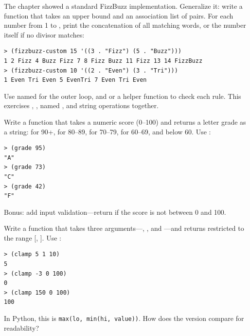 \begin{exercise}
The chapter showed a standard FizzBuzz implementation. Generalize it: write a function  that takes an upper bound  and an association list of  pairs. For each number from 1 to , print the concatenation of all matching words, or the number itself if no divisor matches:

\begin{lstlisting}[style=repl]
> (fizzbuzz-custom 15 '((3 . "Fizz") (5 . "Buzz")))
1 2 Fizz 4 Buzz Fizz 7 8 Fizz Buzz 11 Fizz 13 14 FizzBuzz
> (fizzbuzz-custom 10 '((2 . "Even") (3 . "Tri")))
1 Even Tri Even 5 EvenTri 7 Even Tri Even
\end{lstlisting}

Use named  for the outer loop, and  or a helper function to check each rule. This exercises , , named , and string operations together.
\end{exercise}

\begin{exercise}
Write a function  that takes a numeric score (0--100) and returns a letter grade as a string:  for 90+,  for 80--89,  for 70--79,  for 60--69, and  below 60. Use :

\begin{lstlisting}[style=repl]
> (grade 95)
"A"
> (grade 73)
"C"
> (grade 42)
"F"
\end{lstlisting}

Bonus: add input validation---return  if the score is not between 0 and 100.
\end{exercise}

\begin{exercise}
Write a function  that takes three arguments---, , and ---and returns  restricted to the range [, ]. Use :

\begin{lstlisting}[style=repl]
> (clamp 5 1 10)
5
> (clamp -3 0 100)
0
> (clamp 150 0 100)
100
\end{lstlisting}

In Python, this is \texttt{max(lo, min(hi, value))}. How does the  version compare for readability?
\end{exercise}

